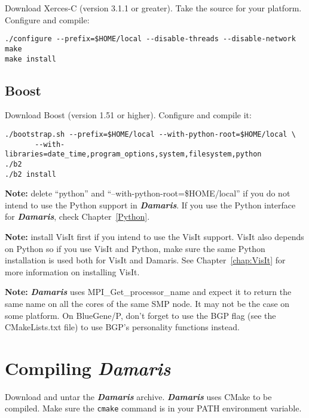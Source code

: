 \documentclass[11pt]{report}
\newcommand{\Damaris}{\emph{\textbf{Damaris}}}
\begin{document}
Download Xerces-C (version 3.1.1 or greater). Take the source for your platform.
Configure and compile:

\begin{verbatim}
./configure --prefix=$HOME/local --disable-threads --disable-network
make
make install
\end{verbatim}

\subsection{Boost}

Download Boost (version 1.51 or higher). Configure and compile it:

\begin{verbatim}
./bootstrap.sh --prefix=$HOME/local --with-python-root=$HOME/local \
       --with-libraries=date_time,program_options,system,filesystem,python 
./b2
./b2 install
\end{verbatim}

\noindent\textbf{Note:} delete ``python'' and ``--with-python-root=\$HOME/local'' if you do not intend 
to use the Python support in \Damaris{}. If you use the Python interface for \Damaris{}, check
Chapter~\ref{Python}.\newline

\noindent\textbf{Note:} install VisIt first if you intend to use the VisIt support. VisIt also depends on Python
so if you use VisIt and Python, make sure the same Python installation is used both for
VisIt and Damaris. See Chapter~\ref{chap:VisIt} for more information on installing VisIt.\newline

\noindent\textbf{Note:} \Damaris{} uses MPI\_Get\_processor\_name and expect it to return the same
name on all the cores of the same SMP node. It may not be the case on some platform. On BlueGene/P, don't forget to use the BGP flag (see the CMakeLists.txt file) to use BGP's personality
functions instead.

\section{Compiling \Damaris{}}

Download and untar the \Damaris{} archive. \Damaris{} uses CMake to be compiled.
Make sure the \texttt{cmake} command is in your PATH environment variable.
\end{document}
